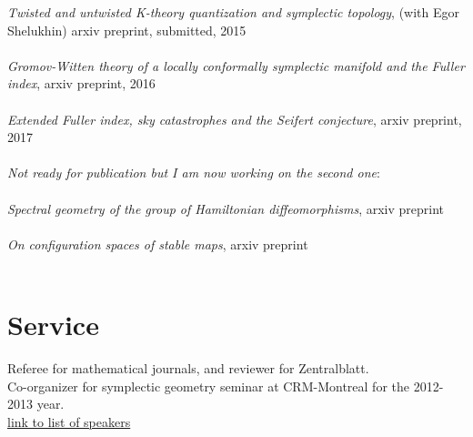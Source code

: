 \documentclass[overlapped,line,letterpaper]{res}
\begin{document}
\begin{resume}
\emph {Twisted and untwisted K-theory quantization and symplectic
topology}, (with Egor Shelukhin) arxiv preprint, submitted,  2015 \\\\
\emph {Gromov-Witten theory of a locally conformally symplectic manifold and the
Fuller index}, arxiv preprint, 2016 \\\\
\emph {Extended Fuller index, sky catastrophes and the Seifert conjecture}, arxiv preprint, 2017 \\\\
\emph {Not ready for publication but I am now working on the second one}: \\\\
\emph{Spectral geometry of the group of Hamiltonian diffeomorphisms},  arxiv preprint \\\\
 {\em {On configuration spaces of stable maps}}, arxiv preprint \\\\ 
\section {\sc Service}
Referee for mathematical journals, and reviewer for Zentralblatt. \\
Co-organizer for symplectic geometry seminar
at CRM-Montreal for the 2012-2013 year. \\
\href{https://docs.google.com/spreadsheet/ccc?key=0AlBCuxjt683fdHYzY2VaSWl1TU1lckctNjJWVndyTHc&usp=docslist_api}
{link to list of speakers}

\end{resume}
\end{document}
